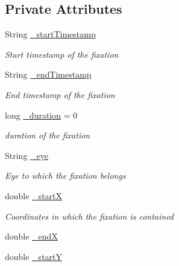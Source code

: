 \subsection*{Private Attributes}
\begin{DoxyCompactItemize}
\item 
String \hyperlink{class_web_analyzer_1_1_models_1_1_analysis_model_1_1_fixation_model_a91602e50b7f2a77eaaae995b5f605d5e}{\+\_\+start\+Timestamp}
\begin{DoxyCompactList}\small\item\em Start timestamp of the fixation \end{DoxyCompactList}\item 
String \hyperlink{class_web_analyzer_1_1_models_1_1_analysis_model_1_1_fixation_model_ab06c88b23bfd1ab3974e50cb7028eac5}{\+\_\+end\+Timestamp}
\begin{DoxyCompactList}\small\item\em End timestamp of the fixation \end{DoxyCompactList}\item 
long \hyperlink{class_web_analyzer_1_1_models_1_1_analysis_model_1_1_fixation_model_a237ba81a634b4460d754da0a8cafb2ef}{\+\_\+duration} = 0
\begin{DoxyCompactList}\small\item\em duration of the fixation \end{DoxyCompactList}\item 
String \hyperlink{class_web_analyzer_1_1_models_1_1_analysis_model_1_1_fixation_model_a88b40bce62fdbc793553ec4f6926b758}{\+\_\+eye}
\begin{DoxyCompactList}\small\item\em Eye to which the fixation belongs \end{DoxyCompactList}\item 
double \hyperlink{class_web_analyzer_1_1_models_1_1_analysis_model_1_1_fixation_model_aae6ca5737e71e087a0adc04a748b3d4a}{\+\_\+start\+X}
\begin{DoxyCompactList}\small\item\em Coordinates in which the fixation is contained \end{DoxyCompactList}\item 
double \hyperlink{class_web_analyzer_1_1_models_1_1_analysis_model_1_1_fixation_model_a7e2e27ddcd00e7cf48253e9a37faf180}{\+\_\+end\+X}
\item 
double \hyperlink{class_web_analyzer_1_1_models_1_1_analysis_model_1_1_fixation_model_aba4f10b5ecaf1bef32a74d00c569ec79}{\+\_\+start\+Y}

\end{DoxyCompactItemize}

